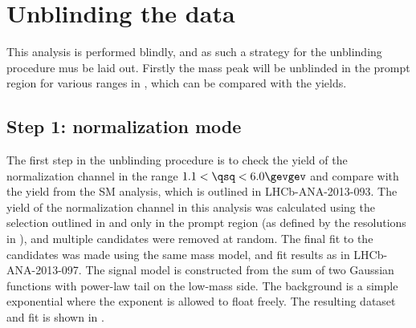 \section{Unblinding the data}

This analysis is performed blindly, and as such a strategy for the unblinding procedure mus be
laid out.
Firstly the \Bd mass peak will be unblinded in the prompt region for various ranges in \qsq, which
can be compared with the \sm yields.

\subsection{Step 1: normalization mode}
The first step in the unblinding procedure is to check the  yield of the normalization channel
\btokstrmumu in the range $1.1<\qsq<6.0\gevgev$ and compare with the yield from the SM analysis,
which is outlined in LHCb-ANA-2013-093.
The yield of the normalization channel in this analysis was calculated using the selection outlined
in  and only in the prompt region (as defined by the resolutions in ),
and multiple candidates were removed at random.
The final fit to the \btokstrmumu candidates was made using the same mass model, and fit results as
in LHCb-ANA-2013-097.
The signal model is constructed from the sum of two Gaussian functions with power-law tail on the
low-mass side.
The background is a simple exponential where the exponent is allowed to float freely.
The resulting dataset and fit is shown in .



